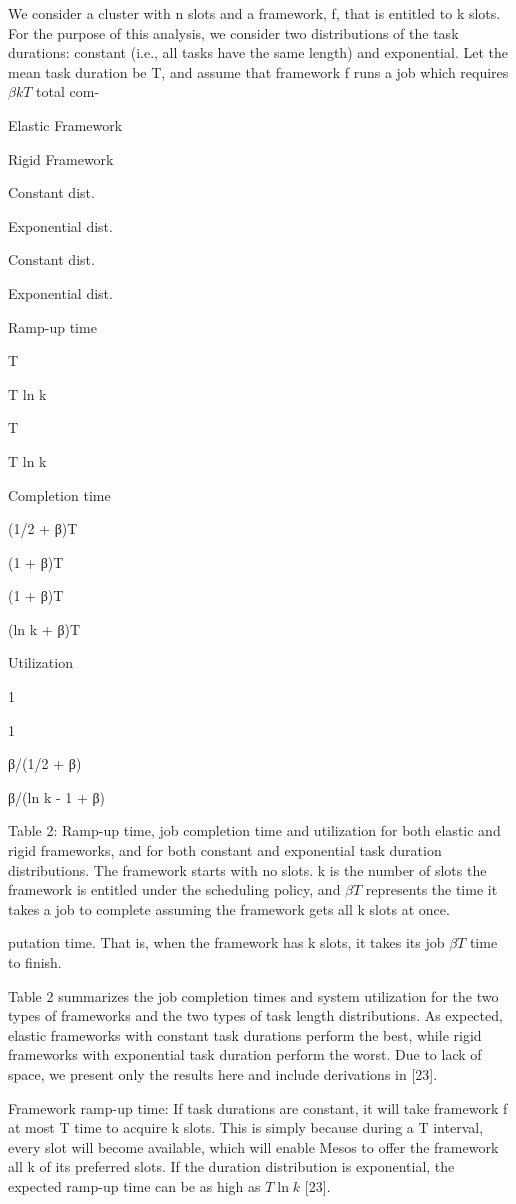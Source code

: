 \documentclass[
]{article}
\begin{document}
We consider a cluster with n slots and a framework, f, that is entitled
to k slots. For the purpose of this analysis, we consider two
distributions of the task durations: constant (i.e., all tasks have the
same length) and exponential. Let the mean task duration be T, and
assume that framework f runs a job which requires \(\beta kT\) total
com-

Elastic Framework

Rigid Framework

Constant dist.

Exponential dist.

Constant dist.

Exponential dist.

Ramp-up time

T

T ln k

T

T ln k

Completion time

(1/2 + β)T

(1 + β)T

(1 + β)T

(ln k + β)T

Utilization

1

1

β/(1/2 + β)

β/(ln k - 1 + β)

Table 2: Ramp-up time, job completion time and utilization for both
elastic and rigid frameworks, and for both constant and exponential task
duration distributions. The framework starts with no slots. k is the
number of slots the framework is entitled under the scheduling policy,
and \(\beta T\) represents the time it takes a job to complete assuming
the framework gets all k slots at once.

putation time. That is, when the framework has k slots, it takes its job
\(\beta T\) time to finish.

Table 2 summarizes the job completion times and system utilization for
the two types of frameworks and the two types of task length
distributions. As expected, elastic frameworks with constant task
durations perform the best, while rigid frameworks with exponential task
duration perform the worst. Due to lack of space, we present only the
results here and include derivations in {[}23{]}.

Framework ramp-up time: If task durations are constant, it will take
framework f at most T time to acquire k slots. This is simply because
during a T interval, every slot will become available, which will enable
Mesos to offer the framework all k of its preferred slots. If the
duration distribution is exponential, the expected ramp-up time can be
as high as \(T \ln k\) {[}23{]}.
\end{document}
